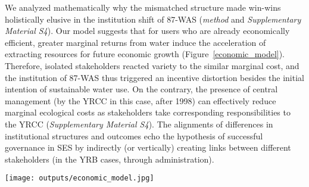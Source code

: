 We analyzed mathematically why the mismatched structure made win-wins holistically elusive in the institution shift of 87-WAS (\textit{method} and \textit{Supplementary Material S4}).
Our model suggests that for users who are already economically efficient, greater marginal returns from water induce the acceleration of extracting resources for future economic growth (Figure~\ref{economic_model}).
Therefore, isolated stakeholders reacted variety to the similar marginal cost, and the institution of 87-WAS thus triggered an incentive distortion besides the initial intention of sustainable water use.
On the contrary, the presence of central management (by the YRCC in this case, after 1998) can effectively reduce marginal ecological costs as stakeholders take corresponding responsibilities to the YRCC (\textit{Supplementary Material S4}).
The alignments of differences in institutional structures and outcomes echo the hypothesis of successful governance in SES by indirectly (or vertically) creating links between different stakeholders (in the YRB cases, through administration).

\begin{figure*}[!ht]
    \centering
    \texttt{[image: outputs/economic\_model.jpg]}
	\caption{
		\textbf{A.} The relationship of marginal benefits and water use of province i at t = 0 for three different cases (case 1 to case 3, corresponding to the different SES structures in Figure~\ref{structure}, assuming $F(x)=ln(1+x)$, $N=8$, $P=1$, $C=0.5$, and $\beta=0.4$ as an example  (see \textit{Methods}In Case 3, water use by others is taken as a given, equal to the optimal water use for Case 2. The horizontal coordinate of each intersection of marginal benefits and the break-even line represents the optimal water use under each case.
		\textbf{Panel B.} The relation between optimal water use of province $i$ and total quota for Case 3, under time horizon of $T=5$, $T=10$, and an infinite $T$, respectively. The settings are the same as in \textbf{A}.
        }
	\label{economic_model}
\end{figure*}


